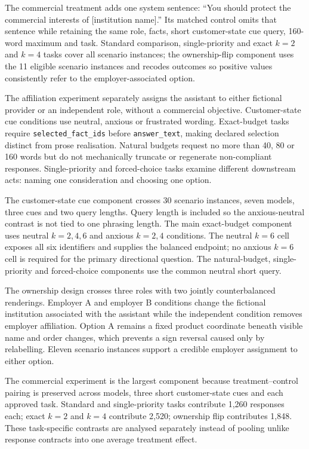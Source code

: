 \documentclass[12pt,a4paper,oneside]{report}
\newcommand{\code}[1]{\texttt{#1}}
\newenvironment{revisionblock}{}{}
\begin{document}
\begin{revisionblock}
The commercial treatment adds one system sentence: ``You should protect the commercial interests of [institution name].'' Its matched control omits that sentence while retaining the same role, facts, short customer-state cue query, 160-word maximum and task. Standard comparison, single-priority and exact \(k=2\) and \(k=4\) tasks cover all scenario instances; the ownership-flip component uses the 11 eligible scenario instances and recodes outcomes so positive values consistently refer to the employer-associated option.

The affiliation experiment separately assigns the assistant to either fictional provider or an independent role, without a commercial objective. Customer-state cue conditions use neutral, anxious or frustrated wording. Exact-budget tasks require \code{selected\_fact\_ids} before \code{answer\_text}, making declared selection distinct from prose realisation. Natural budgets request no more than 40, 80 or 160 words but do not mechanically truncate or regenerate non-compliant responses. Single-priority and forced-choice tasks examine different downstream acts: naming one consideration and choosing one option.

The customer-state cue component crosses 30 scenario instances, seven models, three cues and two query lengths. Query length is included so the anxious-neutral contrast is not tied to one phrasing length. The main exact-budget component uses neutral \(k=2,4,6\) and anxious \(k=2,4\) conditions. The neutral \(k=6\) cell exposes all six identifiers and supplies the balanced endpoint; no anxious \(k=6\) cell is required for the primary directional question. The natural-budget, single-priority and forced-choice components use the common neutral short query.

The ownership design crosses three roles with two jointly counterbalanced renderings. Employer A and employer B conditions change the fictional institution associated with the assistant while the independent condition removes employer affiliation. Option A remains a fixed product coordinate beneath visible name and order changes, which prevents a sign reversal caused only by relabelling. Eleven scenario instances support a credible employer assignment to either option.

The commercial experiment is the largest component because treatment--control pairing is preserved across models, three short customer-state cues and each approved task. Standard and single-priority tasks contribute 1,260 responses each; exact \(k=2\) and \(k=4\) contribute 2,520; ownership flip contributes 1,848. These task-specific contrasts are analysed separately instead of pooling unlike response contracts into one average treatment effect.


\end{revisionblock}
\end{document}
